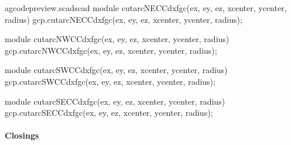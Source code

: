\documentclass{ltxdoc}
\begin{document}
\lstset{firstnumber=\thegcpscad}
\begin{writecode}{a}{gcodepreview.scad}{scad}
module cutarcNECCdxfgc(ex, ey, ez, xcenter, ycenter, radius){
    gcp.cutarcNECCdxfgc(ex, ey, ez, xcenter, ycenter, radius);
}

module cutarcNWCCdxfgc(ex, ey, ez, xcenter, ycenter, radius){
    gcp.cutarcNWCCdxfgc(ex, ey, ez, xcenter, ycenter, radius);
}

module cutarcSWCCdxfgc(ex, ey, ez, xcenter, ycenter, radius){
    gcp.cutarcSWCCdxfgc(ex, ey, ez, xcenter, ycenter, radius);
}

module cutarcSECCdxfgc(ex, ey, ez, xcenter, ycenter, radius){
    gcp.cutarcSECCdxfgc(ex, ey, ez, xcenter, ycenter, radius);
}
\end{writecode}
\addtocounter{gcpscad}{50}

%


\paragraph{Closings}
\end{document}
